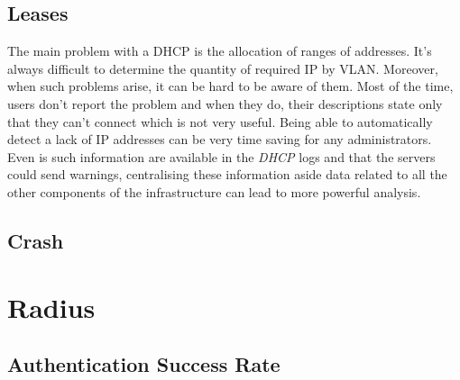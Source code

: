 \subsection{Leases}
The main problem with a DHCP is the allocation of ranges of addresses. It's always difficult to determine the quantity of required IP by VLAN. Moreover, when such problems arise, it can be hard to be aware of them. Most of the time, users don't report the problem and when they do, their descriptions state only that they can't connect which is not very useful. Being able to automatically detect a lack of IP addresses can be very time saving for any administrators. Even is such information are available in the \emph{DHCP} logs and that the servers could send warnings, centralising these information aside data related to all the other components of the infrastructure can lead to more powerful analysis. 

\subsection{Crash}


\section{Radius}

\subsection{Authentication Success Rate}




